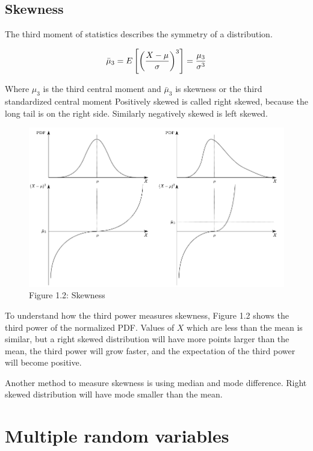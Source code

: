 \subsection{Skewness}

The third moment of statistics describes the symmetry of a distribution.

\[\bar \mu_3 = E\left[ \left( X - \mu \over \sigma \right)^3 \right] = {\mu_3 \over \sigma ^ 3}\]

Where \(\mu_3\) is the third central moment and \(\bar \mu_3\) is skewness or the third standardized central moment Positively skewed is called right skewed, because the long tail is on the right side. Similarly negatively skewed is left skewed.


\begin{figure}[htbp]
    \begin{center}
        \includegraphics[width=350pt]{../img/01-skewness.png}
        \caption{Figure 1.2: Skewness}
    \end{center}
\end{figure}


To understand how the third power measures skewness, Figure 1.2 shows the third power of the normalized PDF. Values of \(X\) which are less than the mean is similar, but a right skewed distribution will have more points larger than the mean, the third power will grow faster, and the expectation of the third power will become positive.

Another method to measure skewness is using median and mode difference. Right skewed distribution will have mode smaller than the mean.

\section{Multiple random variables}

